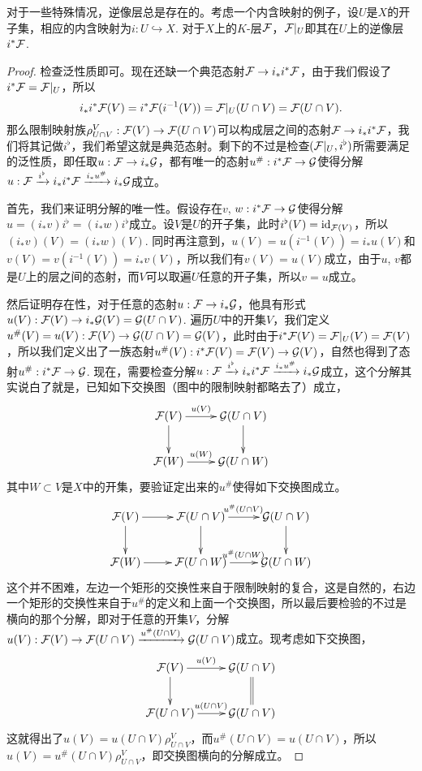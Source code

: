 \begin{pro}
\label{pro:1}对于一些特殊情况，逆像层总是存在的。考虑一个内含映射的例子，设$U$是$X$的开子集，相应的内含映射为$i:U\hookrightarrow X$. 对于$X$上的$K$-层$\mathcal{F}$，$\mathcal{F}|_U$即其在$U$上的逆像层$i^*\mathcal{F}$.
\end{pro}

\begin{proof}
检查泛性质即可。现在还缺一个典范态射$\mathcal{F}\to i_*i^*\mathcal{F}$，由于我们假设了$i^*\mathcal{F}=\mathcal{F}|_U$，所以
\[
	i_*i^*\mathcal{F}(V)=i^*\mathcal{F}(i^{-1}(V))=\mathcal{F}|_U(U\cap V)=\mathcal{F}(U\cap V).
\]
那么限制映射族$\rho^V_{U\cap V}:\mathcal{F}(V)\to \mathcal{F}(U\cap V)$可以构成层之间的态射$\mathcal{F}\to i_*i^*\mathcal{F}$，我们将其记做$i^\flat$，我们希望这就是典范态射。剩下的不过是检查$(\mathcal{F}|_U,i^\flat)$所需要满足的泛性质，即任取$u:\mathcal{F}\to i_*\mathcal{G}$，都有唯一的态射$u^\#:i^*\mathcal{F}\to \mathcal{G}$使得分解$u:\mathcal{F}\xrightarrow{i^\flat} i_*i^*\mathcal{F} \xrightarrow{i_*u^\#} i_*\mathcal{G}$成立。

首先，我们来证明分解的唯一性。假设存在$v$, $w:i^*\mathcal{F}\to \mathcal{G}$使得分解$u=(i_*v)i^\flat=(i_*w)i^\flat$成立。设$V$是$U$的开子集，此时$i^\flat(V)=\operatorname{id}_{\mathcal{F}(V)}$，所以$(i_*v)(V)=(i_*w)(V)$. 同时再注意到，$u(V)=u(i^{-1}(V))=i_*u(V)$和$v(V)=v(i^{-1}(V))=i_*v(V)$，所以我们有$v(V)=u(V)$成立，由于$u$, $v$都是$U$上的层之间的态射，而$V$可以取遍$U$任意的开子集，所以$v=u$成立。

然后证明存在性，对于任意的态射$u:\mathcal{F}\to i_*\mathcal{G}$，他具有形式$u(V):\mathcal{F}(V)\to i_*\mathcal{G}(V)=\mathcal{G}(U\cap V)$. 遍历$U$中的开集$V$，我们定义$u^\#(V)=u(V):\mathcal{F}(V)\to \mathcal{G}(U\cap V)=\mathcal{G}(V)$，此时由于$i^*\mathcal{F}(V)=\mathcal{F}|_U(V)=\mathcal{F}(V)$，所以我们定义出了一族态射$u^\#(V):i^*\mathcal{F}(V)=\mathcal{F}(V)\to \mathcal{G}(V)$，自然也得到了态射$u^\#:i^*\mathcal{F}\to \mathcal{G}$. 现在，需要检查分解$u:\mathcal{F}\xrightarrow{i^\flat} i_*i^*\mathcal{F} \xrightarrow{i_*u^\#} i_*\mathcal{G}$成立，这个分解其实说白了就是，已知如下交换图（图中的限制映射都略去了）成立，
\[
	\xymatrix{
		\calf(V)\ar[r]^-{u(V)} \ar[d]&\calg(U\cap V) \ar[d]\\
		\calf(W)\ar[r]^-{u(W)}&\calg(U\cap W)
	}
\]
其中$W\subset V$是$X$中的开集，要验证定出来的$u^\#$使得如下交换图成立。
\[
	\xymatrix{
		\calf(V)\ar[r] \ar[d]&\ar[r]^{u^\#(U\cap V)}\calf(U\cap V) \ar[d]&\calg(U\cap V) \ar[d]\\
		\calf(W)\ar[r]&\ar[r]^{u^\#(U\cap W)}\calf(U\cap W)&\calg(U\cap W)
	}
\]
这个并不困难，左边一个矩形的交换性来自于限制映射的复合，这是自然的，右边一个矩形的交换性来自于$u^\#$的定义和上面一个交换图，所以最后要检验的不过是横向的那个分解，即对于任意的开集$V$，分解$u(V):\mathcal{F}(V)\to \mathcal{F}(U\cap V) \xrightarrow{u^\#(U\cap V)} \mathcal{G}(U\cap V)$成立。现考虑如下交换图，
\[
	\xymatrix{
		\calf(V)\ar[r]^-{u(V)} \ar[d]&\calg(U\cap V) \ar@{=}[d]\\
		\calf(U\cap V)\ar[r]^{u(U\cap V)}&\calg(U\cap V)
	}
\]
这就得出了$u(V)=u(U\cap V)\rho^V_{U\cap V}$，而$u^\#(U\cap V)=u(U\cap V)$，所以$u(V)=u^\#(U\cap V)\rho^V_{U\cap V}$，即交换图横向的分解成立。
\end{proof}


